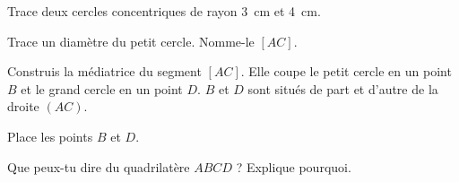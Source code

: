 \begin{myenumerate}
  \item Trace deux cercles concentriques de rayon 3~cm et 4~cm. 
  \item Trace un diamètre du petit cercle. Nomme-le $[AC]$. 
  \item Construis la médiatrice du segment $[AC]$. Elle coupe le petit
  cercle en un  point $B$ et le  grand cercle en un point  $D$. $B$ et
  $D$ sont  situés de part et  d'autre de la  droite $(AC)$.\par Place
  les points $B$ et $D$. 
\item Que peux-tu dire du quadrilatère $ABCD$ ? Explique pourquoi. 
\end{myenumerate}